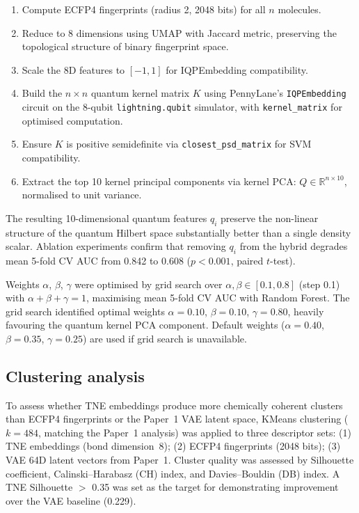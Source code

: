 \documentclass[11pt,a4paper]{article}
\begin{document}
\begin{enumerate}
\item Compute ECFP4 fingerprints (radius 2, \num{2048} bits) for all $n$ molecules.
\item Reduce to 8 dimensions using UMAP with Jaccard metric, preserving the topological structure of binary fingerprint space.
\item Scale the 8D features to $[-1, 1]$ for IQPEmbedding compatibility.
\item Build the $n \times n$ quantum kernel matrix $K$ using PennyLane's \texttt{IQPEmbedding} circuit on the 8-qubit \texttt{lightning.qubit} simulator, with \texttt{kernel\_matrix} for optimised computation.
\item Ensure $K$ is positive semidefinite via \texttt{closest\_psd\_matrix} for SVM compatibility.
\item Extract the top \num{10} kernel principal components via kernel PCA: $Q \in \mathbb{R}^{n \times 10}$, normalised to unit variance.
\end{enumerate}

The resulting 10-dimensional quantum features $q_i$ preserve the non-linear structure of the quantum Hilbert space substantially better than a single density scalar. Ablation experiments confirm that removing $q_i$ from the hybrid degrades mean 5-fold CV AUC from \num{0.842} to \num{0.608} ($p < \num{0.001}$, paired $t$-test).

Weights $\alpha$, $\beta$, $\gamma$ were optimised by grid search over $\alpha, \beta \in [0.1, 0.8]$ (step 0.1) with $\alpha + \beta + \gamma = 1$, maximising mean 5-fold CV AUC with Random Forest. The grid search identified optimal weights $\alpha = 0.10$, $\beta = 0.10$, $\gamma = 0.80$, heavily favouring the quantum kernel PCA component. Default weights ($\alpha = 0.40$, $\beta = 0.35$, $\gamma = 0.25$) are used if grid search is unavailable.

\subsection{Clustering analysis}

To assess whether TNE embeddings produce more chemically coherent clusters than ECFP4 fingerprints or the Paper~1 VAE latent space, KMeans clustering ($k = 484$, matching the Paper~1 analysis) was applied to three descriptor sets: (1) TNE embeddings (bond dimension~8); (2) ECFP4 fingerprints (\num{2048} bits); (3) VAE 64D latent vectors from Paper~1. Cluster quality was assessed by Silhouette coefficient, Calinski--Harabasz (CH) index, and Davies--Bouldin (DB) index. A TNE Silhouette $>$ 0.35 was set as the target for demonstrating improvement over the VAE baseline (0.229).
\end{document}
